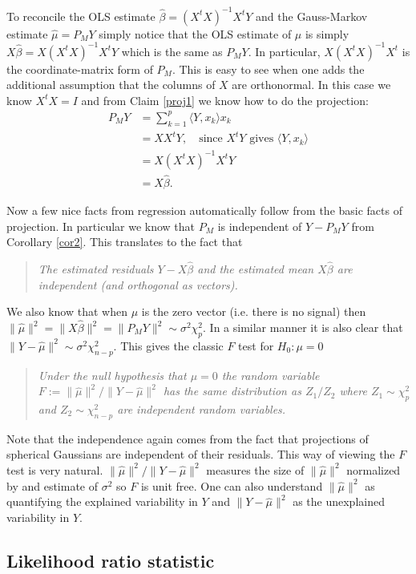 \documentclass[11pt]{report}
\begin{document}
To reconcile the OLS estimate  $\hat\beta = (X^tX)^{-1}X^t Y$ and the Gauss-Markov estimate $\hat\mu = P_M Y$ simply notice that the OLS estimate of $\mu$ is simply $X\hat \beta = X(X^tX)^{-1}X^t Y$ which is the same as $P_M Y$. In particular, $X(X^tX)^{-1}X^t$ is the coordinate-matrix form of $P_M$. This is easy to see when one adds the additional assumption that the columns of $X$ are orthonormal. In this case we know $X^tX = I$ and from Claim \ref{proj1} we know how to do the projection:
\begin{align*}
P_M Y &= \sum_{k=1}^p \langle Y, x_k\rangle x_k \\
&= XX^tY,\quad\text{since $X^tY$ gives $\langle Y, x_k\rangle$}\\
&= X(X^tX)^{-1}X^tY \\
&= X\hat \beta.  
\end{align*}

Now a few nice facts from regression automatically follow from the basic facts of projection. In particular we know that $P_M$ is independent of $Y-P_MY$ from Corollary \ref{cor2}. This translates to the fact that 
\begin{quote}
\em The estimated residuals $Y - X\hat \beta$ and the estimated mean $X\hat \beta$ are independent (and orthogonal as vectors).
\end{quote}
We also know that when $\mu$ is the zero vector (i.e. there is no signal) then $\|\hat \mu \|^2 = \|X\hat\beta \|^2 = \|P_M Y \|^2\sim  \sigma^2 \chi^2_p$. In a similar manner it is also clear that $\|Y - \hat \mu \|^2\sim \sigma^2 \chi^2_{n-p}$. This gives the classic $F$ test for $H_0:\mu=0$
\begin{quote}
\em
Under the null hypothesis that $\mu = 0$ the random variable $F:= {\|\hat \mu \|^2}/{\|Y - \hat \mu \|^2}$ has the same distribution as ${Z_1}/{Z_2}$ where $Z_1\sim \chi^2_p$ and $Z_2\sim \chi^2_{n-p}$ are independent random variables.
\end{quote}
Note that the independence again comes from the fact that projections of spherical Gaussians are independent of their residuals. This way of viewing the $F$ test is very natural. ${\|\hat \mu \|^2}/{\|Y - \hat \mu \|^2}$ measures the size of $\| \hat \mu\|^2$ normalized by and estimate of $\sigma^2$ so $F$ is unit free. One can also understand $\| \hat \mu\|^2$ as quantifying the explained variability in $Y$ and $\|Y - \hat \mu \|^2$ as the unexplained variability in $Y$.


\subsection{Likelihood ratio statistic}
\end{document}
